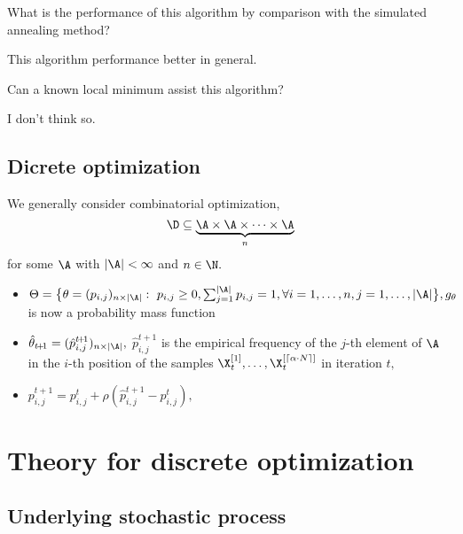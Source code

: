 \begin{ques}
      What is the performance of this algorithm by comparison with the simulated annealing method?
\end{ques}
\begin{answ}
      This algorithm performance better in general.
\end{answ}

\begin{ques}
      Can a known local minimum assist this algorithm?
\end{ques}
\begin{answ}
      I don't think so.
\end{answ}

    \subsection[Discrete]{Dicrete optimization}

    	We generally consider combinatorial optimization, 
    	\[\D\subseteq \underbrace{\A\times\A\times \cdots \times \A}_{n}\] for some $\A$ with $|\A|<\infty$ and $n\in \N.$ \\[1ex]
    	\begin{itemize}
    		\item $\Theta=\big\{\theta = (p_{i,j})_{n\times |\A|}:\ p_{i,j}\ge 0, \sum_{j=1}^{|\A|} p_{i,j}=1, \forall i=1,\ldots,n, j=1,\ldots, |\A|\big\}, g_{\theta}$ is now a probability mass function 
    		\item $\hat{\theta}_{t\!+\!1}=(\hat{p}_{i,j}^{t\!+\!1})_{n\times |\A|},$ 
    		$\hat{p}_{i,j}^{t\!+\!1}$ is the empirical frequency of the $j$-th element of $\A$ in the $i$-th position of the  samples $\X_t^{[1]}, \ldots, \X_t^{[\lceil \alpha \cdot N \rceil]}$ in iteration $t,$
    		\item $p_{i,j}^{t\!+\!1}=p_{i,j}^{t} + \rho (\hat{p}_{i,j}^{t\!+\!1}-p_{i,j}^{t}),$
    	\end{itemize}

    \section[Theory]{Theory for discrete optimization}
    \subsection[Process]{Underlying stochastic process}

